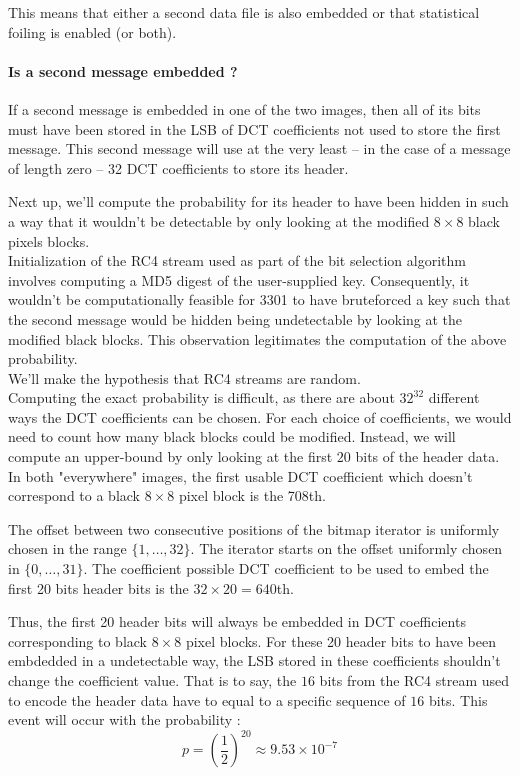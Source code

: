 \documentclass{article}
\begin{document}
This means that either a second data file is also embedded or that statistical foiling is enabled (or both).

\paragraph{Is a second message embedded ?}

If a second message is embedded in one of the two images, then all of its bits must have been stored in the LSB of DCT coefficients not used to store the first message. This second message will use at the very least -- in the case of a message of length zero -- 32 DCT coefficients to store its header.

Next up, we'll compute the probability for its header to have been hidden in such a way that it wouldn't be detectable by only looking at the modified $8 \times 8$ black pixels blocks. \\

Initialization of the RC4 stream used as part of the bit selection algorithm involves computing a MD5 digest of the user-supplied key. Consequently, it wouldn't be computationally feasible for 3301 to have bruteforced a key such that the second message would be hidden being undetectable by looking at the modified black blocks. This observation legitimates the computation of the above probability. \\

We'll make the hypothesis that RC4 streams are random. \\

Computing the exact probability is difficult, as there are about $32^{32}$ different ways the DCT coefficients can be chosen. For each choice of coefficients, we would need to count how many black blocks could be modified. Instead, we will compute an upper-bound by only looking at the first $20$ bits of the header data. \\

In both "everywhere" images, the first usable DCT coefficient which doesn't correspond to a black $8 \times 8$ pixel block is the 708th. 

The offset between two consecutive positions of the bitmap iterator is uniformly chosen in the range $\{ 1, \ldots, 32 \}$. The iterator starts on the offset uniformly chosen in $\{ 0, \ldots, 31\}$. The coefficient possible DCT coefficient to be used to embed the first 20 bits header bits is the $32\times20 = 640$th.

Thus, the first 20 header bits will always be embedded in DCT coefficients corresponding to black $8 \times 8$ pixel blocks. For these 20 header bits to have been embdedded in a undetectable way, the LSB stored in these coefficients shouldn't change the coefficient value. That is to say, the $16$ bits from the RC4 stream used to encode the header data have to equal to a specific sequence of $16$ bits. This event will occur with the probability : \[
	p = \left(\frac 1 2\right)^{20} \approx 9.53 \times 10^{-7}
\]
\end{document}
